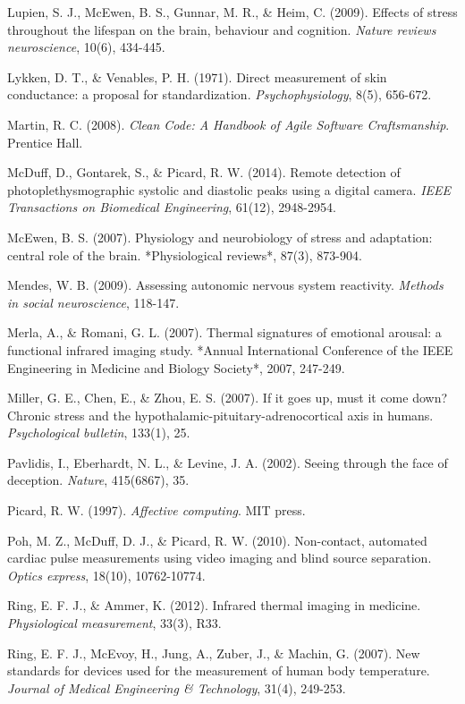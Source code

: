 \documentclass[11pt,a4paper]{article}
\begin{document}
Lupien, S. J., McEwen, B. S., Gunnar, M. R., \& Heim, C. (2009). Effects of stress throughout the lifespan on the brain,
behaviour and cognition. \textit{Nature reviews neuroscience}, 10(6), 434-445.

Lykken, D. T., \& Venables, P. H. (1971). Direct measurement of skin conductance: a proposal for standardization.
\textit{Psychophysiology}, 8(5), 656-672.

Martin, R. C. (2008). \textit{Clean Code: A Handbook of Agile Software Craftsmanship}. Prentice Hall.

McDuff, D., Gontarek, S., \& Picard, R. W. (2014). Remote detection of photoplethysmographic systolic and diastolic peaks
using a digital camera. \textit{IEEE Transactions on Biomedical Engineering}, 61(12), 2948-2954.

McEwen, B. S. (2007). Physiology and neurobiology of stress and adaptation: central role of the brain. *Physiological
reviews*, 87(3), 873-904.

Mendes, W. B. (2009). Assessing autonomic nervous system reactivity. \textit{Methods in social neuroscience}, 118-147.

Merla, A., \& Romani, G. L. (2007). Thermal signatures of emotional arousal: a functional infrared imaging study. *Annual
International Conference of the IEEE Engineering in Medicine and Biology Society*, 2007, 247-249.

Miller, G. E., Chen, E., \& Zhou, E. S. (2007). If it goes up, must it come down? Chronic stress and the
hypothalamic-pituitary-adrenocortical axis in humans. \textit{Psychological bulletin}, 133(1), 25.

Pavlidis, I., Eberhardt, N. L., \& Levine, J. A. (2002). Seeing through the face of deception. \textit{Nature}, 415(6867), 35.

Picard, R. W. (1997). \textit{Affective computing}. MIT press.

Poh, M. Z., McDuff, D. J., \& Picard, R. W. (2010). Non-contact, automated cardiac pulse measurements using video imaging
and blind source separation. \textit{Optics express}, 18(10), 10762-10774.

Ring, E. F. J., \& Ammer, K. (2012). Infrared thermal imaging in medicine. \textit{Physiological measurement}, 33(3), R33.

Ring, E. F. J., McEvoy, H., Jung, A., Zuber, J., \& Machin, G. (2007). New standards for devices used for the measurement
of human body temperature. \textit{Journal of Medical Engineering \& Technology}, 31(4), 249-253.
\end{document}
